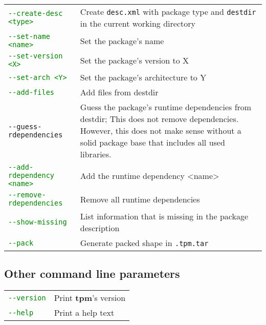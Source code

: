 \documentclass[a4paper]{article}
\newcommand{\file}[1]{\texttt{#1}}
\newcommand{\program}[1]{\textbf{#1}}
\newcommand{\green}[1]{\textcolor{green}{#1}}
\begin{document}
	\bgroup
	\def\arraystretch{1.5}
	\begin{tabularx}{\textwidth}{lX}
		\green{\texttt{-{}-create-desc <type>}} & Create \file{desc.xml} with package type and \file{destdir} in the current working directory \\
		
		\green{\texttt{-{}-set-name <name>}} & Set the package's name \\
		
		\green{\texttt{-{}-set-version <X>}} & Set the package's version to X \\
		
		\green{\texttt{-{}-set-arch <Y>}} & Set the package's architecture to Y \\
		
		\green{\texttt{-{}-add-files}} & Add files from destdir \\
		
		\texttt{-{}-guess-rdependencies} & Guess the package's runtime dependencies from destdir; This does not remove dependencies. However, this does not make sense without a solid package base that includes all used libraries. \\
		
		\green{\texttt{-{}-add-rdependency <name>}} & Add the runtime dependency <name> \\
		
		\green{\texttt{-{}-remove-rdependencies}} & Remove all runtime dependencies \\
		
		\green{\texttt{-{}-show-missing}} & List information that is missing in the package description \\
		
		\green{\texttt{-{}-pack}} & Generate packed shape in \texttt{.tpm.tar}
	\end{tabularx}
	\egroup

	\subsection{Other command line parameters}
	\label{sec:other_command_line_parameters}
	
	\bgroup
	\def\arraystretch{1.5}
	\begin{tabularx}{\textwidth}{lX}
		\green{\texttt{-{}-version}} & Print \program{tpm}'s version \\
		\green{\texttt{-{}-help}} & Print a help text
	\end{tabularx}
	\egroup
	
\end{document}
